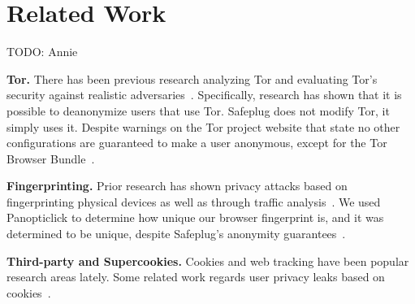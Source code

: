 \section{Related Work}
\label{sec:related}

TODO: Annie

{\bf Tor.} There has been previous research analyzing Tor and evaluating Tor's security against realistic adversaries~\cite{tor2}.  Specifically, research has shown that it is possible to deanonymize users that use Tor.  Safeplug does not modify Tor, it simply uses it.  Despite warnings on the Tor project website that state no other configurations are guaranteed to make a user anonymous, except for the Tor Browser Bundle~\cite{torproject}.

{\bf Fingerprinting.}  Prior research has shown privacy attacks based on fingerprinting physical devices as well as through traffic analysis~\cite{fingerprint1, fingerprint2}.  We used Panopticlick to determine how unique our browser fingerprint is, and it was determined to be unique, despite Safeplug's anonymity guarantees~\cite{pano}.

{\bf Third-party and Supercookies.} Cookies and web tracking have been popular research areas lately.  Some related work regards user privacy leaks based on cookies~\cite{commercial1, commercial2}.
